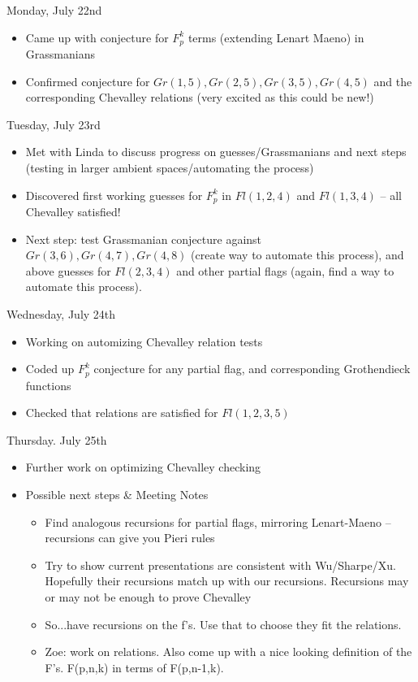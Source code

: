 Monday, July 22nd
\begin{itemize}
    \item Came up with conjecture for $F_p^k$ terms (extending Lenart Maeno) in Grassmanians
    \item Confirmed conjecture for $Gr(1, 5), Gr(2, 5), Gr(3, 5), Gr(4, 5)$ and the corresponding Chevalley relations (very excited as this could be new!)
\end{itemize}

Tuesday, July 23rd
\begin{itemize}
    \item Met with Linda to discuss progress on guesses/Grassmanians and next steps (testing in larger ambient spaces/automating the process)
    \item Discovered first working guesses for $F_p^k$ in $Fl(1, 2, 4)$ and $Fl(1, 3, 4)$ -- all Chevalley satisfied!
    \item Next step: test Grassmanian conjecture against $Gr(3, 6), Gr(4, 7), Gr(4, 8)$ (create way to automate this process), and above guesses for $Fl(2, 3, 4)$ and other partial flags (again, find a way to automate this process).
\end{itemize}

Wednesday, July 24th
\begin{itemize}
    \item Working on automizing Chevalley relation tests
    \item Coded up $F_p^k$ conjecture for any partial flag, and corresponding Grothendieck functions
    \item Checked that relations are satisfied for $Fl(1, 2, 3, 5)$
\end{itemize}

Thursday. July 25th
\begin{itemize}
    \item Further work on optimizing Chevalley checking
    \item Possible next steps \& Meeting Notes
    \begin{itemize}
        \item Find analogous recursions for partial flags, mirroring Lenart-Maeno -- recursions can give you Pieri rules
        \item Try to show current presentations are consistent with Wu/Sharpe/Xu. Hopefully their recursions match up with our recursions. Recursions may or may not be enough to prove Chevalley
        \item So...have recursions on the f's. Use that to choose they fit the relations.
        \item Zoe: work on relations. Also come up with a nice looking definition of the F's. F(p,n,k) in terms of F(p,n-1,k). 
    \end{itemize} 
\end{itemize}

